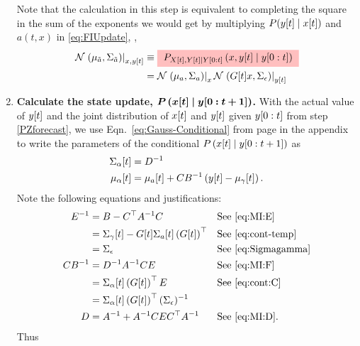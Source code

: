 \begin{enumerate}
    Note that the calculation in this step is equivalent to completing
    the square in the sum of the exponents we would get by multiplying
    $P({y}{[t]} \mid {x}{[t]})$ and $a(t,x)$ in
    \eqref{eq:FIUpdate}, \ie,
    \begin{align}
      \nonumber
      \NormalE{\mu_{\tilde a}}{\Sigma_{\tilde a}}{x,\ti{y}{t}}
      &\equiv \JointForecast{X}{x}{t} \\
      \label{eq:NormalJointForecast}
      &= \NormalE{\mu_a}{\Sigma_a}{x} \NormalE{\ti{G}{t}x}{\Sigma_\epsilon}{\ti{y}{t}}
    \end{align}
  \item \label{PXupdate} \textbf{Calculate the state update,
      $\bm{P\left({x}{[t]}\mid y[0:t+1] \right)}$.}  With the
    actual value of ${y}{[t]}$ and the joint distribution of
    ${x}{[t]}$ and ${y}{[t]}$ given $y[0:t]$ from step
    \ref{PZforecast}, we use Eqn.~\eqref{eq:Gauss-Conditional} from
    page \pageref{eq:Gauss-Conditional} in the appendix to write the
    parameters of the conditional
    $P\left({x}{[t]}\mid y[0:t+1] \right)$ as
  \begin{subequations}
    \label{eq:UpdateRaw}
    \begin{align}
      {\Sigma_\alpha}{[t]} &= D^{-1} \\
      {\mu_\alpha}{[t]} &= {\mu_a}{[t]} + CB^{-1} \left(
        {y}{[t]} - {\mu_\gamma}{[t]}\right).
    \end{align}
  \end{subequations}
  Note the following equations and justifications:
  \begin{align*}
    E^{-1} &= B - C^\top A^{-1}C && \text{See \eqref{eq:MI:E}}\\
    &= {\Sigma_\gamma}{[t]} - {G}{[t]}{\Sigma_a}{[t]} \left(
    {G}{[t]}\right)^\top && \text{See \eqref{eq:cont-temp}}\\
    &= \Sigma_\epsilon && \text{See \eqref{eq:Sigmagamma}}\\
    CB^{-1} &= D^{-1}A^{-1}CE && \text{See \eqref{eq:MI:F}} \\
    &= {\Sigma_\alpha}{[t]} \left( {G}{[t]}
    \right)^\top E && \text{See \eqref{eq:cont:C}}\\
    &= {\Sigma_\alpha}{[t]} \left( {G}{[t]}
    \right)^\top (\Sigma_\epsilon)^{-1}\\
    D &= A^{-1} + A^{-1} CEC^\top A^{-1} && \text{See \eqref{eq:MI:D}}.
  \end{align*}
  Thus

\end{enumerate}
